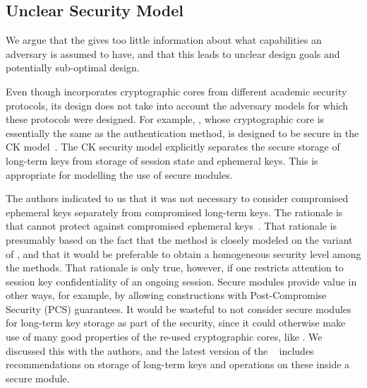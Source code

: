\documentclass[a4paper,twoside,draft]{article}
\begin{document}
\subsection{Unclear Security Model}
%
We argue that the \mSpec{} gives too little information about what capabilities
an adversary is assumed to have, and that this leads to unclear design goals and
potentially sub-optimal design.
%
%

%
Even though \mEdhoc{} incorporates cryptographic cores from different academic
security protocols, its design does not take into account the adversary models
for which these protocols were designed.
%
For example, \mOptls{}, whose cryptographic core is essentially the same
as the \mStat{} authentication method, is designed to be secure in the CK
model~\cite{DBLP:conf/crypto/CanettiK02}.
%
The CK security model explicitly separates the secure storage of long-term
keys from storage of session state and ephemeral keys.
%
This is appropriate for modelling the use of secure modules.
%

The \mEdhoc{} authors indicated to us that it was
not necessary to consider compromised ephemeral keys separately from
compromised long-term keys.
%
The rationale is that \mSigma{} cannot protect against compromised ephemeral
keys~\cite{personalCommunication}.
%
That rationale is presumably based on the fact that the \mSigSig{} method is
closely modeled on the \mSigmaI{} variant of \mSigma{}, and that it would be
preferable to obtain a homogeneous security level among the \mEdhoc{}
methods.
%
That rationale is only true, however, if one restricts attention to session key
confidentiality of an ongoing session.
%
Secure modules provide value in other ways, for example, by allowing
constructions with Post-Compromise Security (PCS) guarantees.
%
It would be wasteful to not consider secure modules for long-term key storage
as part of the security, since it could otherwise make use of many good
properties of the re-used cryptographic cores, like \mOptls.
%
We discussed this with the authors, and
the latest version of the \mSpec{}~\cite{latest-ietf-lake-edhoc-05} includes
recommendations on storage of long-term keys and operations on these inside a
secure module.
%
\end{document}
